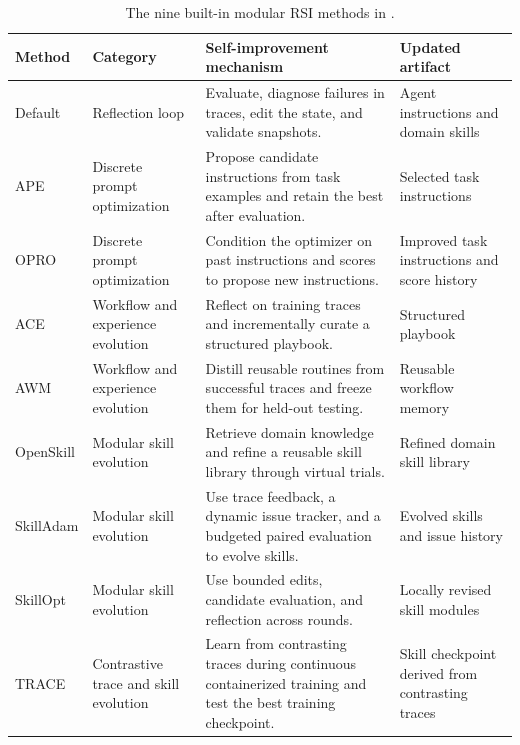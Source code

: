 \begin{table}[t]
  \centering
  \small
  \caption{The nine built-in modular RSI methods in \fwname.}
  \label{tab:methods}
  \begin{tabular}{@{}p{}p{}p{}p{}@{}}
    \toprule
    \textbf{Method} & \textbf{Category} & \textbf{Self-improvement mechanism} & \textbf{Updated artifact} \\
    \midrule
    Default & Reflection loop & Evaluate, diagnose failures in traces, edit the state, and validate snapshots. & Agent instructions and domain skills \\
    APE & Discrete prompt optimization & Propose candidate instructions from task examples and retain the best after evaluation. & Selected task instructions \\
    OPRO & Discrete prompt optimization & Condition the optimizer on past instructions and scores to propose new instructions. & Improved task instructions and score history \\
    ACE & Workflow and experience evolution & Reflect on training traces and incrementally curate a structured playbook. & Structured playbook \\
    AWM & Workflow and experience evolution & Distill reusable routines from successful traces and freeze them for held-out testing. & Reusable workflow memory \\
    OpenSkill & Modular skill evolution & Retrieve domain knowledge and refine a reusable skill library through virtual trials. & Refined domain skill library \\
    SkillAdam & Modular skill evolution & Use trace feedback, a dynamic issue tracker, and a budgeted paired evaluation to evolve skills. & Evolved skills and issue history \\
    SkillOpt & Modular skill evolution & Use bounded edits, candidate evaluation, and reflection across rounds. & Locally revised skill modules \\
    TRACE & Contrastive trace and skill evolution & Learn from contrasting traces during continuous containerized training and test the best training checkpoint. & Skill checkpoint derived from contrasting traces \\
    \bottomrule
  \end{tabular}
\end{table}
